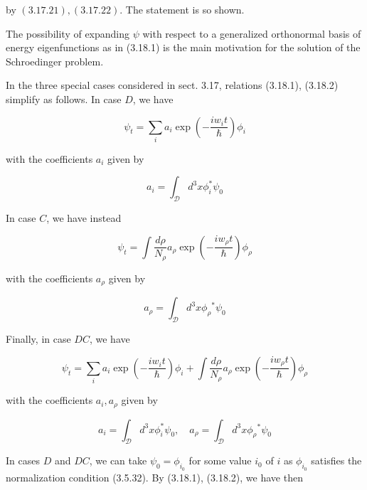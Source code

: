 \documentclass{article}
\begin{document}
by $(3.17 .21),(3.17 .22)$. The statement is so shown.

The possibility of expanding $\psi$ with respect to a generalized orthonormal basis of energy eigenfunctions as in (3.18.1) is the main motivation for the solution of the Schroedinger problem.

In the three special cases considered in sect. 3.17, relations (3.18.1), (3.18.2) simplify as follows. In case $D$, we have
 
\begin{equation*}
\psi_{t}=\sum_{i} a_{i} \exp \left(-\frac{i w_{i} t}{\hbar}\right) \phi_{i} \tag{3.18.5}
\end{equation*}
 
with the coefficients $a_{i}$ given by
 
\begin{equation*}
a_{i}=\int_{\mathcal{D}} d^{3} x \phi_{i}^{*} \psi_{0} \tag{3.18.6}
\end{equation*}
 

In case $C$, we have instead
 
\begin{equation*}
\psi_{t}=\int \frac{d \rho}{N_{\rho}} a_{\rho} \exp \left(-\frac{i w_{\rho} t}{\hbar}\right) \phi_{\rho} \tag{3.18.7}
\end{equation*}
 
with the coefficients $a_{\rho}$ given by
 
\begin{equation*}
a_{\rho}=\int_{\mathcal{D}} d^{3} x \phi_{\rho}{ }^{*} \psi_{0} \tag{3.18.8}
\end{equation*}
 

Finally, in case $D C$, we have
 
\begin{equation*}
\psi_{t}=\sum_{i} a_{i} \exp \left(-\frac{i w_{i} t}{\hbar}\right) \phi_{i}+\int \frac{d \rho}{N_{\rho}} a_{\rho} \exp \left(-\frac{i w_{\rho} t}{\hbar}\right) \phi_{\rho} \tag{3.18.9}
\end{equation*}
 
with the coefficients $a_{i}, a_{\rho}$ given by
 
\begin{equation*}
a_{i}=\int_{\mathcal{D}} d^{3} x \phi_{i}^{*} \psi_{0}, \quad a_{\rho}=\int_{\mathcal{D}} d^{3} x \phi_{\rho}{ }^{*} \psi_{0} \tag{3.18.10}
\end{equation*}
 

In cases $D$ and $D C$, we can take $\psi_{0}=\phi_{i_{0}}$ for some value $i_{0}$ of $i$ as $\phi_{i_{0}}$ satisfies the normalization condition (3.5.32). By (3.18.1), (3.18.2), we have then
 
\end{document}
